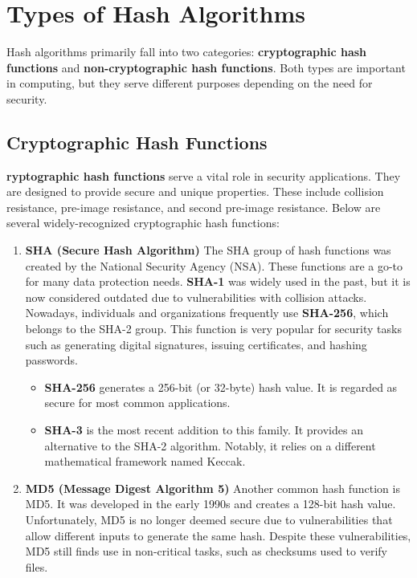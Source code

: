 \documentclass[11pt,a4paper]{article}
\begin{document}
\section*{Types of Hash Algorithms}
Hash algorithms primarily fall into two categories: \textbf{cryptographic hash functions} and \textbf{non-cryptographic hash functions}. Both types are important in computing, but they serve different purposes depending on the need for security.

    \subsection*{Cryptographic Hash Functions}
    \textbf{ryptographic hash functions} serve a vital role in security applications. They are designed to provide secure and unique properties. These include collision resistance, pre-image resistance, and second pre-image resistance. Below are several widely-recognized cryptographic hash functions:
        \begin{enumerate}
            \item \textbf{SHA (Secure Hash Algorithm)}
            \newline
            The SHA group of hash functions was created by the National Security Agency (NSA). These functions are a go-to for many data protection needs. \textbf{SHA-1} was widely used in the past, but it is now considered outdated due to vulnerabilities with collision attacks. Nowadays, individuals and organizations frequently use \textbf{SHA-256}, which belongs to the SHA-2 group. This function is very popular for security tasks such as generating digital signatures, issuing certificates, and hashing passwords.

                \begin{itemize}
                    \item \textbf{SHA-256} generates a 256-bit (or 32-byte) hash value. It is regarded as secure for most common applications.
                    
                    \item \textbf{SHA-3} is the most recent addition to this family. It provides an alternative to the SHA-2 algorithm. Notably, it relies on a different mathematical framework named Keccak.
                \end{itemize}

            \item \textbf{MD5 (Message Digest Algorithm 5)}
            \newline
            Another common hash function is MD5. It was developed in the early 1990s and creates a 128-bit hash value. Unfortunately, MD5 is no longer deemed secure due to vulnerabilities that allow different inputs to generate the same hash. Despite these vulnerabilities, MD5 still finds use in non-critical tasks, such as checksums used to verify files.

        \end{enumerate}
\end{document}
